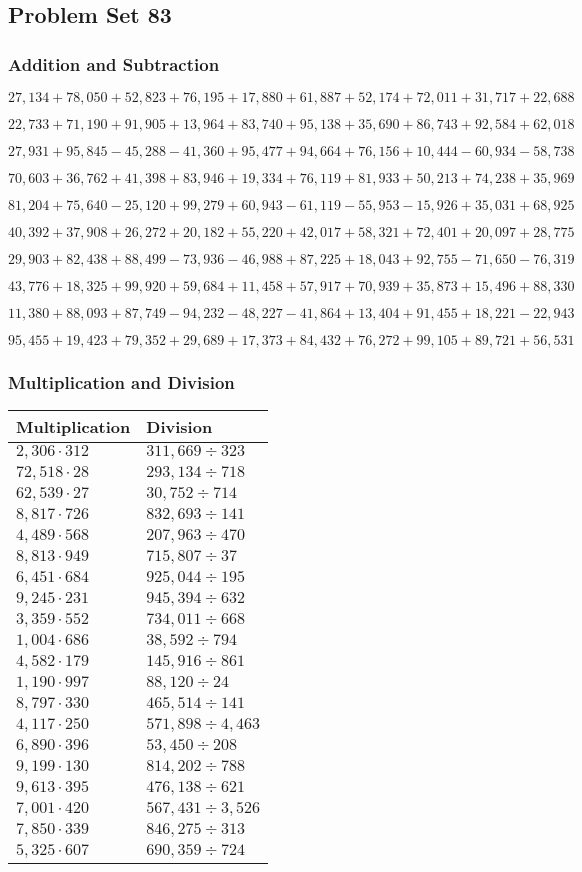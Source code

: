 \hypertarget{problem-set-83}{%
\subsection{Problem Set 83}\label{problem-set-83}}

\hypertarget{addition-and-subtraction-305}{%
\subsubsection{Addition and
Subtraction}\label{addition-and-subtraction-305}}

\(27,134+78,050+52,823+76,195+17,880+61,887+52,174+72,011+31,717+ 22,688\)

\(22,733+71,190+91,905+13,964+83,740+95,138+35,690+86,743+92,584+62,018\)

\(27,931+95,845-45,288-41,360+95,477+94,664+76,156+10,444-60,934-58,738\)

\(70,603+36,762+41,398+83,946+19,334+76,119+81,933+50,213+74,238+35,969\)

\(81,204+75,640-25,120+99,279+60,943-61,119-55,953-15,926+35,031+68,925\)

\(40,392+37,908+26,272+20,182+55,220+42,017+58,321+72,401+20,097+28,775\)

\(29,903+82,438+88,499-73,936-46,988+87,225+18,043+92,755-71,650-76,319\)

\(43,776+18,325+99,920+59,684+11,458+57,917+70,939+35,873+15,496+88,330\)

\(11,380+88,093+87,749-94,232-48,227-41,864+13,404+91,455+18,221-22,943\)

\(95,455+19,423+79,352+29,689+17,373+84,432+76,272+99,105+89,721+56,531\)

\hypertarget{multiplication-and-division-304}{%
\subsubsection{Multiplication and
Division}\label{multiplication-and-division-304}}

\begin{longtable}[]{@{}ll@{}}
\toprule
Multiplication & Division\tabularnewline
\midrule
\endhead
\(2,306\cdot312\) & \(311,669÷323\)\tabularnewline
\(72,518\cdot28\) & \(293,134÷718\)\tabularnewline
\(62,539\cdot27\) & \(30,752÷714\)\tabularnewline
\(8,817\cdot726\) & \(832,693÷141\)\tabularnewline
\(4,489\cdot568\) & \(207,963÷470\)\tabularnewline
\(8,813\cdot949\) & \(715,807÷37\)\tabularnewline
\(6,451\cdot684\) & \(925,044÷195\)\tabularnewline
\(9,245\cdot231\) & \(945,394÷632\)\tabularnewline
\(3,359\cdot552\) & \(734,011÷668\)\tabularnewline
\(1,004\cdot686\) & \(38,592÷794\)\tabularnewline
\(4,582\cdot179\) & \(145,916÷861\)\tabularnewline
\(1,190\cdot997\) & \(88,120÷24\)\tabularnewline
\(8,797\cdot330\) & \(465,514÷141\)\tabularnewline
\(4,117\cdot250\) & \(571,898÷4,463\)\tabularnewline
\(6,890\cdot396\) & \(53,450÷208\)\tabularnewline
\(9,199\cdot130\) & \(814,202÷788\)\tabularnewline
\(9,613\cdot395\) & \(476,138÷621\)\tabularnewline
\(7,001\cdot420\) & \(567,431÷3,526\)\tabularnewline
\(7,850\cdot339\) & \(846,275÷313\)\tabularnewline
\(5,325\cdot607\) & \(690,359÷724\)\tabularnewline
\bottomrule
\end{longtable}

